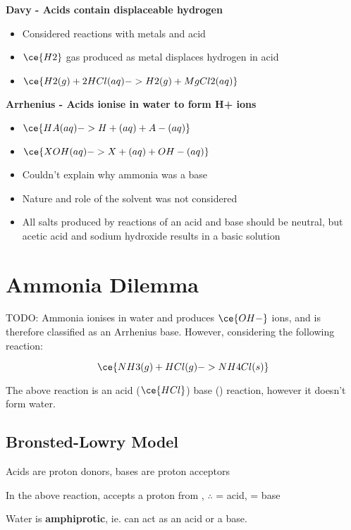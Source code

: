 	\textbf{Davy - Acids contain displaceable hydrogen}
	\begin{itemize}
		\item Considered reactions with metals and acid
		\item $\ce{H2}$ gas produced as metal displaces hydrogen in acid
		\item $\ce{H2(g) + 2HCl(aq) -> H2(g) + MgCl2(aq)}$
	\end{itemize}

	\textbf{Arrhenius - Acids ionise in water to form H+ ions}
	\begin{itemize}
		\item $\ce{HA(aq) -> H+(aq) + A-(aq)}$
		\item $\ce{XOH(aq) -> X+(aq) + OH-(aq)}$
		\item Couldn't explain why ammonia was a base
		\item Nature and role of the solvent was not considered
		\item All salts produced by reactions of an acid and base should be neutral, but acetic acid and sodium hydroxide results in a basic solution
	\end{itemize}

\section{Ammonia Dilemma} \label{12/02/2025} TODO:
	Ammonia ionises in water and produces $\ce{OH-}$ ions, and is therefore classified as an Arrhenius base. However, considering the following reaction:

	$$\ce{NH3(g) + HCl(g) -> NH4Cl(s)}$$

	The above reaction is an acid ($\ce{HCl}$) base () reaction, however it doesn't form water.

	\subsection{Bronsted-Lowry Model}
 		Acids are proton donors, bases are proton acceptors
		\bgroup
			\centering
		\egroup

		In the above reaction,  accepts a proton from , $\therefore$  = acid,  = base

		\bgroup
			\centering
		\egroup

		Water is \textbf{amphiprotic}, ie. can act as an acid or a base.

